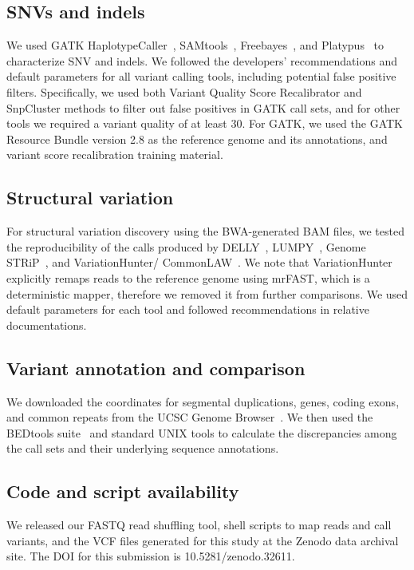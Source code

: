 \documentclass{bioinfo}
\begin{document}
\begin{methods}
\vspace*{-0.3cm}
\subsection*{SNVs and indels}

We used GATK HaplotypeCaller~\citep{DePristo2011}, SAMtools~\citep{Li2009b}, Freebayes~\citep{Garrison2012}, and Platypus~\citep{Rimmer2014} to characterize
SNV and indels. We followed the developers' recommendations and default parameters for all variant calling tools, including potential false positive filters. 
Specifically, we used both Variant Quality Score Recalibrator and SnpCluster methods to filter out false positives in GATK call sets, and for other tools
we required a variant quality of at least 30.
For GATK, we used the GATK Resource Bundle version 2.8 as the reference genome and its annotations, and variant score recalibration training material.

\vspace*{-0.3cm}
\subsection*{Structural variation}

For structural variation discovery using the BWA-generated BAM files, we tested the reproducibility of the calls produced by DELLY~\citep{Rausch2012}, LUMPY~\citep{Layer2014}, Genome STRiP~\citep{Handsaker2015}, and VariationHunter/ CommonLAW~\citep{Hormozdiari2009,Hormozdiari2011b}. We note that VariationHunter explicitly remaps reads to the reference genome using mrFAST, which is a deterministic mapper, therefore we removed it from further comparisons.
We used default parameters for each tool and followed recommendations in relative documentations.

\vspace*{-0.3cm}
\subsection*{Variant annotation and comparison}

We downloaded the coordinates for segmental duplications, genes, coding exons, and common repeats from the UCSC Genome Browser~\citep{Kent2002}. 
We then used the BEDtools suite~\citep{Quinlan2010a} and standard UNIX tools 
 to calculate the discrepancies among the call sets and their underlying sequence annotations.

\vspace*{-0.3cm}
\subsection*{Code and script availability} We released our FASTQ read shuffling tool, shell scripts to map reads and call variants, and the VCF files generated for this study at the Zenodo data archival site.
The DOI for this submission is 10.5281/zenodo.32611.


\end{methods}
\end{document}
